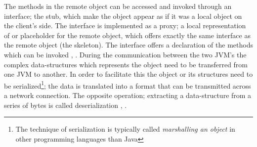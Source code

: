 \documentclass[Main]{subfiles}
\begin{document}
The methods in the remote object can be accessed and invoked through an interface; the stub, which make the object appear as if it was a local object on the client's side. The interface is implemented as a proxy; a local representation of or placeholder for the remote object, which offers exactly the same interface as the remote object (the skeleton). The interface offers a declaration of the methods which can be invoked \cite[p. 461]{Tanenbaum}, \cite{RMI-slides}. During the communication between the two JVM's the complex data-structures which represents the object need to be transferred from one JVM to another. In order to facilitate this the object or its structures need to be serialized\footnote{The technique of serialization is typically called \textit{marshalling an object} in other programming languages than Java}; the data is translated into a format that can be transmitted across a network connection. The opposite operation; extracting a data-structure from a series of bytes is called deserialization \cite[p. 462]{Tanenbaum}, \cite{wiki-serialization}.
\end{document}

